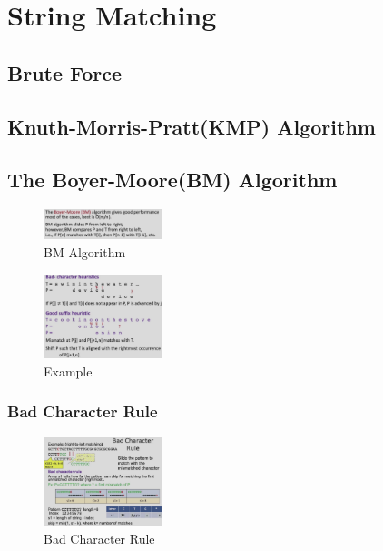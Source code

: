 \newpage
\section{String Matching}


\subsection{Brute Force}

\subsection{Knuth-Morris-Pratt(KMP) Algorithm}


\subsection{The Boyer-Moore(BM) Algorithm}
\begin{figure}[H]
    \centering
    \includegraphics[width=0.309\textwidth]{pic/DAA7/BM Algorithm}
    \caption{BM Algorithm}
\end{figure}

\begin{figure}[H]
    \centering
    \includegraphics[width=0.309\textwidth]{pic/DAA7/BM Algorithm exp1.png}
    \caption{Example}
\end{figure}

\subsubsection{Bad Character Rule}

\begin{figure}[H]
    \centering
    \includegraphics[width=0.309\textwidth]{pic/DAA7/Bad Character Rule}
    \caption{Bad Character Rule}
\end{figure}

